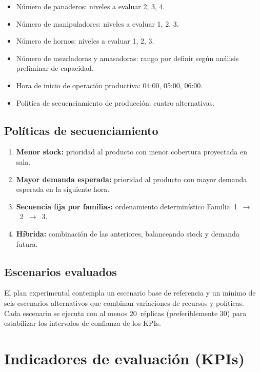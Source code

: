 \documentclass[12pt]{article}
\begin{document}
\begin{itemize}
  \item Número de panaderos: niveles a evaluar 2, 3, 4.
  \item Número de manipuladores: niveles a evaluar 1, 2, 3.
  \item Número de hornos: niveles a evaluar 1, 2, 3.
  \item Número de mezcladoras y amasadoras: rango por definir según análisis preliminar de capacidad.
  \item Hora de inicio de operación productiva: 04:00, 05:00, 06:00.
  \item Política de secuenciamiento de producción: cuatro alternativas.
\end{itemize}

\subsection{Políticas de secuenciamiento}

\begin{enumerate}
  \item \textbf{Menor stock:} prioridad al producto con menor cobertura proyectada en sala.
  \item \textbf{Mayor demanda esperada:} prioridad al producto con mayor demanda esperada en la siguiente hora.
  \item \textbf{Secuencia fija por familias:} ordenamiento determinístico Familia~1~$\to$~2~$\to$~3.
  \item \textbf{Híbrida:} combinación de las anteriores, balanceando stock y demanda futura.
\end{enumerate}

\subsection{Escenarios evaluados}

El plan experimental contempla un escenario base de referencia y un mínimo de seis escenarios alternativos que combinan variaciones de recursos y políticas. Cada escenario se ejecuta con al menos 20~réplicas (preferiblemente 30) para estabilizar los intervalos de confianza de los KPIs.

\newpage
\section{Indicadores de evaluación (KPIs)}
\end{document}
